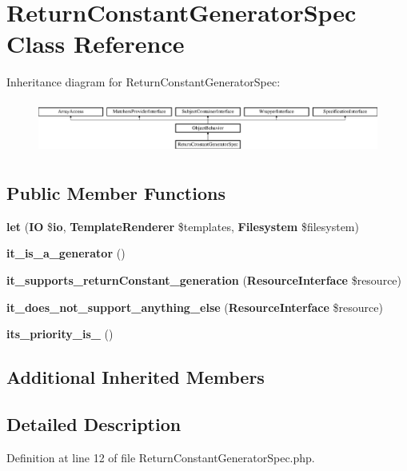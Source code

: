 \section{Return\+Constant\+Generator\+Spec Class Reference}
\label{classspec_1_1_php_spec_1_1_code_generator_1_1_generator_1_1_return_constant_generator_spec}
Inheritance diagram for Return\+Constant\+Generator\+Spec\+:\begin{figure}[H]
\begin{center}
\leavevmode
\includegraphics[height=1.750000cm]{classspec_1_1_php_spec_1_1_code_generator_1_1_generator_1_1_return_constant_generator_spec}
\end{center}
\end{figure}
\subsection*{Public Member Functions}
\begin{DoxyCompactItemize}
\item 
{\bf let} ({\bf I\+O} \${\bf io}, {\bf Template\+Renderer} \$templates, {\bf Filesystem} \$filesystem)
\item 
{\bf it\+\_\+is\+\_\+a\+\_\+generator} ()
\item 
{\bf it\+\_\+supports\+\_\+return\+Constant\+\_\+generation} ({\bf Resource\+Interface} \$resource)
\item 
{\bf it\+\_\+does\+\_\+not\+\_\+support\+\_\+anything\+\_\+else} ({\bf Resource\+Interface} \$resource)
\item 
{\bf its\+\_\+priority\+\_\+is\+\_} ()
\end{DoxyCompactItemize}
\subsection*{Additional Inherited Members}


\subsection{Detailed Description}


Definition at line 12 of file Return\+Constant\+Generator\+Spec.\+php.



